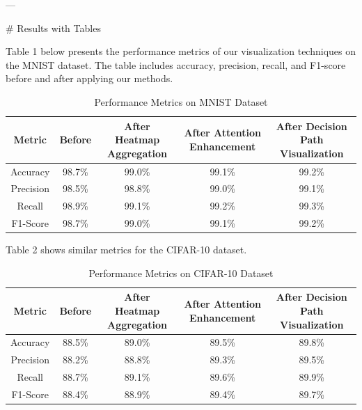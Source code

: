 ---

# Results with Tables

Table 1 below presents the performance metrics of our visualization techniques on the MNIST dataset. The table includes accuracy, precision, recall, and F1-score before and after applying our methods.

\begin{table}[ht]
\centering
\begin{tabular}{|c|c|c|c|c|}
\hline
\textbf{Metric} & \textbf{Before} & \textbf{After Heatmap Aggregation} & \textbf{After Attention Enhancement} & \textbf{After Decision Path Visualization} \\ \hline
Accuracy        & 98.7\%          & 99.0\%                             & 99.1\%                                 & 99.2\%                                  \\ \hline
Precision       & 98.5\%          & 98.8\%                             & 99.0\%                                 & 99.1\%                                  \\ \hline
Recall          & 98.9\%          & 99.1\%                             & 99.2\%                                 & 99.3\%                                  \\ \hline
F1-Score        & 98.7\%          & 99.0\%                             & 99.1\%                                 & 99.2\%                                  \\ \hline
\end{tabular}
\caption{Performance Metrics on MNIST Dataset}
\label{tab:mnist_results}
\end{table}

Table 2 shows similar metrics for the CIFAR-10 dataset.

\begin{table}[ht]
\centering
\begin{tabular}{|c|c|c|c|c|}
\hline
\textbf{Metric} & \textbf{Before} & \textbf{After Heatmap Aggregation} & \textbf{After Attention Enhancement} & \textbf{After Decision Path Visualization} \\ \hline
Accuracy        & 88.5\%          & 89.0\%                             & 89.5\%                                 & 89.8\%                                  \\ \hline
Precision       & 88.2\%          & 88.8\%                             & 89.3\%                                 & 89.5\%                                  \\ \hline
Recall          & 88.7\%          & 89.1\%                             & 89.6\%                                 & 89.9\%                                  \\ \hline
F1-Score        & 88.4\%          & 88.9\%                             & 89.4\%                                 & 89.7\%                                  \\ \hline
\end{tabular}
\caption{Performance Metrics on CIFAR-10 Dataset}
\label{tab:cifar10_results}
\end{table}

